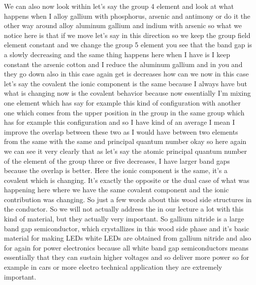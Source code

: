 We can also now look within let's say the group 4 element and look at what happens when I alloy gallium with phosphorus, arsenic and antimony or do it the other way around alloy aluminum gallium and indium with arsenic so what we notice here is that if we move let's say in this direction so we keep the group field element constant and we change the group 5 element you see that the band gap is a slowly decreasing and the same thing happens here when I have is I keep constant the arsenic cotton and I reduce the aluminum gallium and in you and they go down also in this case again get is decreases how can we now in this case let's say the covalent the ionic component is the same because I always have but what is changing now is the covalent behavior because now essentially I'm mixing one element which has say for example this kind of configuration with another one which comes from the upper position in the group in the same group which has for example this configuration and so I have kind of an average I mean I improve the overlap between these two as I would have between two elements from the same with the same and principal quantum number okay so here again we can see it very clearly that as let's say the atomic principal quantum number of the element of the group three or five decreases, I have larger band gaps because the overlap is better. Here the ionic component is the same, it's a covalent which is changing. It's exactly the opposite or the dual case of what was happening here where we have the same covalent component and the ionic contribution was changing.
So just a few words about this wood side structures in the conductor. So we will not actually address the in our lecture a lot with this kind of material, but they actually very important. So gallium nitride is a large band gap semiconductor, which crystallizes in this wood side phase and it's basic material for making LEDs white LEDs are obtained from gallium nitride and also for again for power electronics because all white band gap semiconductors means essentially that they can sustain higher voltages and so deliver more power so for example in cars or more electro technical application they are extremely important.
